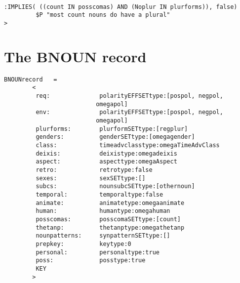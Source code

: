 \begin{verbatim}

:IMPLIES( ((count IN posscomas) AND (Noplur IN plurforms)), false)
         $P "most count nouns do have a plural"
>

\end{verbatim}

\appendix
\newpage
\section{The BNOUN record}
\begin{verbatim}
BNOUNrecord   =
		<
		 req:              polarityEFFSETtype:[pospol, negpol, 
						  omegapol]    
		 env:              polarityEFFSETtype:[pospol, negpol, 
						  omegapol]    
		 plurforms:        plurformSETtype:[regplur]
		 genders:          genderSETtype:[omegagender] 
		 class:            timeadvclasstype:omegaTimeAdvClass
		 deixis:           deixistype:omegadeixis
		 aspect:           aspecttype:omegaAspect
		 retro:            retrotype:false
		 sexes:            sexSETtype:[]
		 subcs:            nounsubcSETtype:[othernoun]
		 temporal:         temporaltype:false
		 animate:          animatetype:omegaanimate
		 human:            humantype:omegahuman
		 posscomas:        posscomaSETtype:[count]
		 thetanp:          thetanptype:omegathetanp
		 nounpatterns:     synpatternSETtype:[]
		 prepkey:          keytype:0
		 personal:         personaltype:true
		 poss:             posstype:true               
		 KEY              
		>
\end{verbatim}

\newpage
